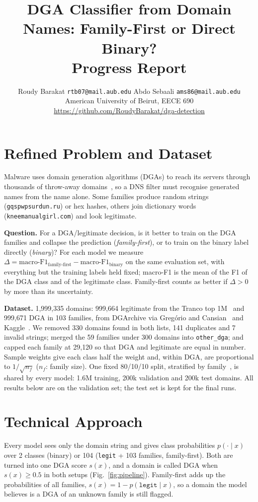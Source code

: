 \documentclass[11pt]{article}
\title{\vspace{-2.4em}\textbf{DGA Classifier from Domain Names: Family-First or Direct Binary?}\\[0.2em]\large Progress Report}
\author{
  Roudy Barakat \quad \texttt{rtb07@mail.aub.edu} \qquad
  Abdo Sebaali \quad \texttt{ams86@mail.aub.edu} \\[0.2em]
  \small American University of Beirut, EECE 690 \quad \url{https://github.com/RoudyBarakat/dga-detection}
}
\date{\vspace{-2.2em}}
\begin{document}
\maketitle

\section{Refined Problem and Dataset}
Malware uses domain generation algorithms (DGAs) to reach its servers through
thousands of throw-away domains~\cite{plohmann2016dgarchive}, so a DNS filter must
recognise generated names from the name alone. Some families produce random
strings (\texttt{gqspwpsurdun.ru}) or hex hashes, others join dictionary words
(\texttt{kneemanualgirl.com}) and look legitimate.

\textbf{Question.} For a DGA/legitimate decision, is it better to train on the DGA
families and collapse the prediction (\emph{family-first}), or to train on the
binary label directly (\emph{binary})? For each model we measure
$\Delta = \text{macro-F1}_{\text{family-first}} - \text{macro-F1}_{\text{binary}}$
on the same evaluation set, with everything but the training labels held fixed;
macro-F1 is the mean of the F1 of the DGA class and of the legitimate class.
Family-first counts as better if $\Delta > 0$ by more than its uncertainty.

\textbf{Dataset.} 1{,}999{,}335 domains: 999{,}664 legitimate from the Tranco top
1M~\cite{lepochat2019tranco} and 999{,}671 DGA in 103 families, from
DGArchive via Greg{\'o}rio and Cansian~\cite{gregorio2025dataset,plohmann2016dgarchive}
and Kaggle~\cite{givre2021kaggle}. We removed 330 domains found in both lists,
141 duplicates and 7 invalid strings; merged the 59 families under 300 domains into
\texttt{other\_dga}; and capped each family at 29{,}120 so that DGA and legitimate
are equal in number. Sample weights give each class half the weight and, within
DGA, are proportional to $1/\sqrt{n_f}$ ($n_f$: family size). One fixed 80/10/10
split, stratified by family~\cite{shahzad2021dga}, is shared by every model:
1.6M training, 200k validation and 200k test domains. All results below are on
the validation set; the test set is kept for the final runs.

\section{Technical Approach}
Every model sees only the domain string and gives class probabilities
$p(\cdot \mid x)$ over 2 classes (binary) or 104 (\texttt{legit} + 103 families,
family-first). Both are turned into one DGA score $s(x)$, and a domain is called
DGA when $s(x) \ge 0.5$ in both setups (Fig.~\ref{fig:pipeline}). Family-first
adds up the probabilities of all families, $s(x) = 1 - p(\texttt{legit} \mid x)$,
so a domain the model believes is a DGA of an unknown family is still flagged.
\end{document}
